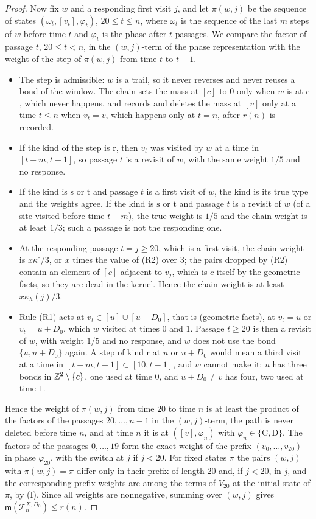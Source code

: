 \begin{proof}
Now fix $w$ and a responding first visit $j$, and let $\pi(w, j)$ be the sequence of states $(\omega_t, [v_t], \varphi_t)$, $20 \le t \le n$, where $\omega_t$ is the sequence of the last $m$ steps of $w$ before time $t$ and $\varphi_t$ is the phase after $t$ passages. We compare the factor of passage $t$, $20 \le t < n$, in the $(w, j)$-term of the phase representation with the weight of the step of $\pi(w, j)$ from time $t$ to $t + 1$.
\begin{itemize}
\item The step is admissible: $w$ is a trail, so it never reverses and never reuses a bond of the window. The chain sets the mass at $[c]$ to $0$ only when $w$ is at $c$, which never happens, and records and deletes the mass at $[v]$ only at a time $t \le n$ when $v_t = v$, which happens only at $t = n$, after $r(n)$ is recorded.
\item If the kind of the step is $\mathrm r$, then $v_t$ was visited by $w$ at a time in $[t - m, t - 1]$, so passage $t$ is a revisit of $w$, with the same weight $1/5$ and no response.
\item If the kind is $\mathrm s$ or $\mathrm t$ and passage $t$ is a first visit of $w$, the kind is its true type and the weights agree. If the kind is $\mathrm s$ or $\mathrm t$ and passage $t$ is a revisit of $w$ (of a site visited before time $t - m$), the true weight is $1/5$ and the chain weight is at least $1/3$; such a passage is not the responding one.
\item At the responding passage $t = j \ge 20$, which is a first visit, the chain weight is $x \kappa^\circ/3$, or $x$ times the value of (R2) over $3$; the pairs dropped by (R2) contain an element of $[c]$ adjacent to $v_j$, which is $c$ itself by the geometric facts, so they are dead in the kernel. Hence the chain weight is at least $x \kappa_h(j)/3$.
\item Rule (R1) acts at $v_t \in [u] \cup [u + D_0]$, that is (geometric facts), at $v_t = u$ or $v_t = u + D_0$, which $w$ visited at times $0$ and $1$. Passage $t \ge 20$ is then a revisit of $w$, with weight $1/5$ and no response, and $w$ does not use the bond $\{u, u + D_0\}$ again. A step of kind $\mathrm r$ at $u$ or $u + D_0$ would mean a third visit at a time in $[t - m, t - 1] \subset [10, t - 1]$, and $w$ cannot make it: $u$ has three bonds in $\mathbb{Z}^2 \setminus \{c\}$, one used at time $0$, and $u + D_0 \neq v$ has four, two used at time $1$.
\end{itemize}
Hence the weight of $\pi(w, j)$ from time $20$ to time $n$ is at least the product of the factors of the passages $20, \dots, n - 1$ in the $(w, j)$-term, the path is never deleted before time $n$, and at time $n$ it is at $([v], \varphi_n)$ with $\varphi_n \in \{\mathrm C, \mathrm D\}$. The factors of the passages $0, \dots, 19$ form the exact weight of the prefix $(v_0, \dots, v_{20})$ in phase $\varphi_{20}$, with the switch at $j$ if $j < 20$. For fixed states $\pi$ the pairs $(w, j)$ with $\pi(w, j) = \pi$ differ only in their prefix of length $20$ and, if $j < 20$, in $j$, and the corresponding prefix weights are among the terms of $V_{20}$ at the initial state of $\pi$, by (I). Since all weights are nonnegative, summing over $(w, j)$ gives $\mathsf m(\mathcal T^{X, D_0}_n) \le r(n)$.

\end{proof}
